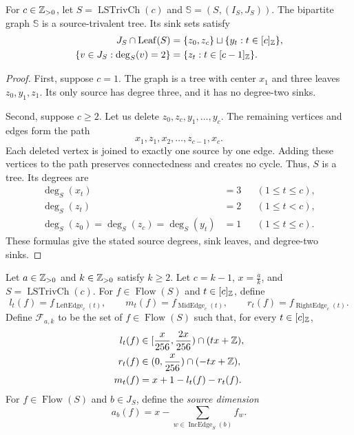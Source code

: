\begin{lemma}\label{lem:labeled-chain-tree}
For $c\in\mathbb Z_{>0}$, let $S=\operatorname{LSTrivCh}(c)$ and $\mathbb S=(S,(I_S,J_S))$.
The bipartite graph $\mathbb S$ is a source-trivalent tree.
Its sink sets satisfy
\[
 \begin{aligned}
 J_S\cap\operatorname{Leaf}(S)&=\{z_0,z_c\}\sqcup\{y_t:t\in[c]_{\mathbb Z}\},\\
 \{v\in J_S:\deg_S(v)=2\}&=\{z_t:t\in[c-1]_{\mathbb Z}\}.
 \end{aligned}
\]
\end{lemma}
\begin{proof}
First, suppose $c=1$. The graph is a tree with center $x_1$ and three leaves $z_0,y_1,z_1$.
Its only source has degree three, and it has no degree-two sinks.

Second, suppose $c\ge2$. Let us delete $z_0,z_c,y_1,\ldots,y_c$.
The remaining vertices and edges form the path
\[
 x_1,z_1,x_2,\ldots,z_{c-1},x_c.
\]
Each deleted vertex is joined to exactly one source by one edge.
Adding these vertices to the path preserves connectedness and creates no cycle.
Thus, $S$ is a tree. Its degrees are
\[
\begin{aligned}
 \deg_S(x_t)&=3 &&(1\le t\le c),\\
 \deg_S(z_t)&=2 &&(1\le t<c),\\
 \deg_S(z_0)=\deg_S(z_c)=\deg_S(y_t)&=1 &&(1\le t\le c).
\end{aligned}
\]
These formulas give the stated source degrees, sink leaves, and degree-two sinks.
\end{proof}

\begin{definition}\label{def:chain-flow-family}
Let $a\in\mathbb Z_{>0}$ and $k\in\mathbb Z_{>0}$ satisfy $k\ge2$.
Let $c=k-1$, $x=\frac ak$, and $S=\operatorname{LSTrivCh}(c)$.
For $f\in\operatorname{Flow}(S)$ and $t\in[c]_{\mathbb Z}$, define
\[
 l_t(f)=f_{\operatorname{LeftEdge}_c(t)},\qquad
 m_t(f)=f_{\operatorname{MidEdge}_c(t)},\qquad
 r_t(f)=f_{\operatorname{RightEdge}_c(t)}.
\]
Define $\mathcal F_{a,k}$ to be the set of $f\in\operatorname{Flow}(S)$ such that, for every $t\in[c]_{\mathbb Z}$,
\[
\begin{aligned}
 l_t(f)&\in[\frac{x}{256},\frac{2x}{256})\cap(tx+\mathbb Z),\\
 r_t(f)&\in(0,\frac{x}{256})\cap(-tx+\mathbb Z),\\
 m_t(f)&=x+1-l_t(f)-r_t(f).
\end{aligned}
\]
For $f\in\operatorname{Flow}(S)$ and $b\in J_S$, define the \textit{source dimension}
\[
 a_b(f)=x-\sum_{w\in\operatorname{IncEdge}_S(b)}f_w.
\]
\end{definition}

